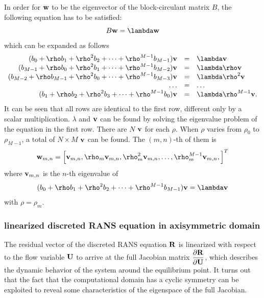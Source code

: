 \documentclass[journal,final]{new-aiaa}
\begin{document}
In order for $\mathbf{w}$ to be the eigenvector of the block-circulant matrix $B$,
the following equation has to be satisfied:
\begin{equation*}
B \w = \lambda \w
\end{equation*}
which can be expanded as follows
\begin{equation*}
\begin{array}{rcl}
(b_0 + \rho b_1+ \rho^2 b_2 + \cdots + \rho ^{M-1}b_{M-1}) \vv& = & \lambda \vv\\
(b_{M-1} + \rho b_0+ \rho^2 b_1 + \cdots + \rho ^{M-1}b_{M-2}) \vv& = & \lambda\rho  \vv\\
(b_{M-2} + \rho b_{M-1}+ \rho^2 b_0 + \cdots + \rho ^{M-1}b_{M-3}) \vv& = & \lambda\rho^2  \vv\\
\dots & = & \dots\\
(b_1 + \rho b_2+ \rho^2 b_3 + \cdots + \rho ^{M-1}b_{0}) \vv& = & \lambda\rho^{M-1} \vv.
\end{array}
\end{equation*}
It can be seen that all rows are identical to the first row, different only by a scalar multiplication.
$\lambda$ and $\mathbf{v}$ can be found by solving the eigenvalue problem of the equation
in the first row. There are $N$ $\mathbf{v}$ for each $\rho$. When $\rho$ varies from $\rho_0$
to $\rho_{M-1}$, a total of $N\times M$ $\mathbf{v}$ can be found. The $(m,n)$-th of them is
\begin{equation*}
\w_{m,n}=
\left[
\vv_{m,n} ,
\rho_m \vv_{m,n} ,
\rho_m^2 \vv_{m,n} ,
\dots ,
\rho_m^{M-1}\vv_{m,n},
\right]^T
\end{equation*}
where $\mathbf{v}_{m,n}$ is the $n$-th eigenvalue of 
\begin{equation*}
(b_0 + \rho b_1+ \rho^2 b_2 + \cdots + \rho^{M-1}b_{M-1}) \vv =  \lambda \vv
\end{equation*}
with $\rho=\rho_m$.


\subsubsection{linearized discreted RANS equation in axisymmetric domain}
The residual vector of the discreted RANS equation $\mathbf{R}$ is linearized with respect
to the flow variable  $\mathbf{U}$ to arrive at the full Jacobian matrix $\dfrac{\partial\mathbf{R}}{\partial\mathbf{U}}$, which describes the
dynamic behavior of the system around the equilibrium point. It turns out that the fact that
the computational domain has a cyclic symmetry can be exploited to reveal some
characteristics of the eigenspace of the full Jacobian.
\end{document}
